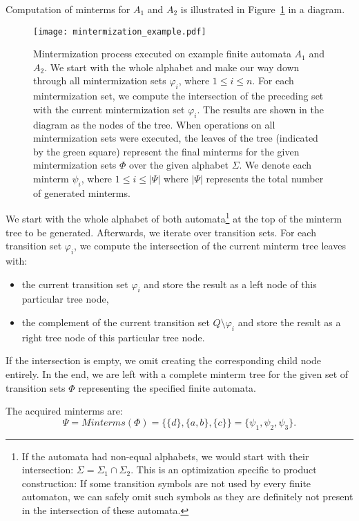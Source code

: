 Computation of minterms for $A_1$ and $A_2$ is illustrated in Figure~\ref{fig:diagram:mintermization_example} in a diagram.

\begin{figure}[ht]
	\centering
	\texttt{[image: mintermization\_example.pdf]}
	\caption{Mintermization process executed on example finite automata $A_1$ and $A_2$. We start with the whole alphabet and make our way down through all mintermization sets $\varphi_i$, where $1 \leq i \leq n$. For each mintermization set, we compute the intersection of the preceding set with the current mintermization set $\varphi_i$. The results are shown in the diagram as the nodes of the tree. When operations on all mintermization sets were executed, the leaves of the tree (indicated by the green square) represent the final minterms for the given mintermization sets $\Phi$ over the given alphabet $\Sigma$. We denote each minterm $\psi_i$, where $1 \leq i \leq |\Psi|$ where $|\Psi|$ represents the total number of generated minterms.}
	\label{fig:diagram:mintermization_example}
\end{figure}

We start with the whole alphabet of both automata\footnote{If the automata had non-equal alphabets, we would start with their intersection: $\Sigma = \Sigma_1 \cap \Sigma_2$. This is an optimization specific to product construction: If some transition symbols are not used by every finite automaton, we can safely omit such symbols as they are definitely not present in the intersection of these automata.} at the top of the minterm tree to be generated. Afterwards, we iterate over transition sets. For each transition set $\varphi_i$, we compute the intersection of the current minterm tree leaves with:
\begin{itemize}
    \item the current transition set $\varphi_i$ and store the result as a left node of this particular tree node,
    \item the complement of the current transition set $Q \setminus \varphi_i$ and store the result as a right tree node of this particular tree node.
\end{itemize}

If the intersection is empty, we omit creating the corresponding child node entirely. In the end, we are left with a complete minterm tree for the given set of transition sets $\Phi$ representing the specified finite automata.

The acquired minterms are:
$$ \Psi = Minterms(\Phi) = \bigl\{ \{d\}, \{a, b\}, \{c\} \bigr\} = \{ \psi_1, \psi_2, \psi_3 \} \text{.}$$

